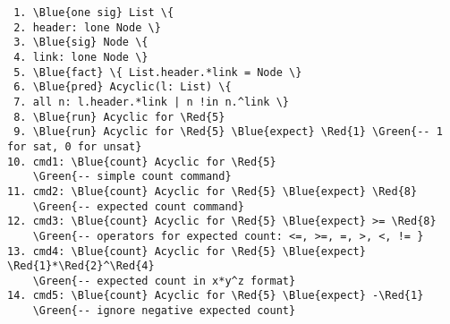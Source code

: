\begin{Verbatim}
 1. \Blue{one sig} List \{
 2.	header: lone Node \}
 3. \Blue{sig} Node \{
 4.	link: lone Node \}
 5. \Blue{fact} \{ List.header.*link = Node \}
 6. \Blue{pred} Acyclic(l: List) \{
 7.	all n: l.header.*link | n !in n.^link \}
 8. \Blue{run} Acyclic for \Red{5}
 9. \Blue{run} Acyclic for \Red{5} \Blue{expect} \Red{1} \Green{-- 1 for sat, 0 for unsat}
10. cmd1: \Blue{count} Acyclic for \Red{5}
    \Green{-- simple count command}
11. cmd2: \Blue{count} Acyclic for \Red{5} \Blue{expect} \Red{8}
    \Green{-- expected count command}
12. cmd3: \Blue{count} Acyclic for \Red{5} \Blue{expect} >= \Red{8}
    \Green{-- operators for expected count: <=, >=, =, >, <, != }
13. cmd4: \Blue{count} Acyclic for \Red{5} \Blue{expect} \Red{1}*\Red{2}^\Red{4}
    \Green{-- expected count in x*y^z format}
14. cmd5: \Blue{count} Acyclic for \Red{5} \Blue{expect} -\Red{1}
    \Green{-- ignore negative expected count}
\end{Verbatim}

